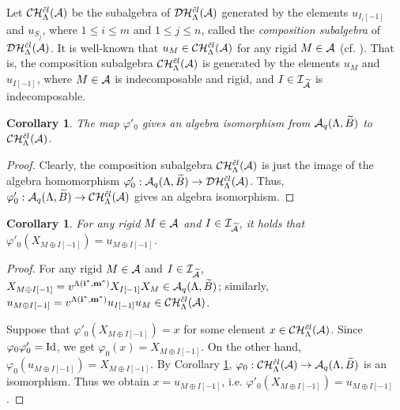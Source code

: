 \documentclass[reqno,12pt]{amsart}
\numberwithin{equation}{section}
\theoremstyle{plain} %
\newtheorem{corollary}[theorem]{\bf Corollary}
\theoremstyle{definition} %
\begin{document}
Let $\mathcal {C}\mathcal {H}_\Lambda^{{\tilde{c}l}}({\mathcal{A}})$ be the subalgebra of $\mathcal {D}\mathcal {H}_\Lambda^{{\tilde{c}l}}({\mathcal{A}})$ generated by the elements $u_{I_i[-1]}$ and $u_{S_j}$, where $1\leq i\leq m$ and $1\leq j\leq n$, called the {\em composition subalgebra} of $\mathcal {D}\mathcal {H}_\Lambda^{{\tilde{c}l}}({\mathcal{A}})$.
It is well-known that $u_M\in\mathcal {C}\mathcal {H}_\Lambda^{{\tilde{c}l}}({\mathcal{A}})$ for any rigid $M\in\mathcal{A}$ (cf. \cite[Theorem 2]{ZhangP}). That is, the composition subalgebra $\mathcal {C}\mathcal {H}_\Lambda^{{\tilde{c}l}}({\mathcal{A}})$ is generated by the elements $u_M$ and $u_{I[-1]}$, where $M\in \mathcal{A}$ is indecomposable and rigid, and $I\in \mathcal{I}_{\widetilde{\mathcal{A}}}$ is indecomposable.
\begin{corollary}\label{congshixian}
The map $\varphi'_0$ gives an algebra isomorphism from $\mathcal{A}_q(\Lambda,\widetilde{B})$ to $\mathcal {C}\mathcal {H}_\Lambda^{{\tilde{c}l}}({\mathcal{A}})$.
\end{corollary}
\begin{proof}
Clearly, the composition subalgebra $\mathcal {C}\mathcal {H}_\Lambda^{{\tilde{c}l}}({\mathcal{A}})$ is just the image of the algebra homomorphism $\varphi'_0:\mathcal{A}_q(\Lambda,\widetilde{B})\rightarrow\mathcal {D}\mathcal {H}_\Lambda^{{\tilde{c}l}}({\mathcal{A}})$. Thus, $\varphi'_0:\mathcal{A}_q(\Lambda,\widetilde{B})\rightarrow \mathcal {C}\mathcal {H}_\Lambda^{{\tilde{c}l}}({\mathcal{A}})$ gives an algebra isomorphism.
\end{proof}
\begin{corollary}\label{congshixianimg}
For any rigid $M\in{\mathcal{A}}$ and $I\in \mathcal{I}_{\widetilde{\mathcal{A}}}$, it holds that $\varphi'_0(X_{M\oplus I[-1]})=u_{M\oplus I[-1]}$.
\end{corollary}
\begin{proof}
For any rigid $M\in{\mathcal{A}}$ and $I\in \mathcal{I}_{\widetilde{\mathcal{A}}}$, $X_{M\oplus I[-1]}=v^{\Lambda({\bf i}^\ast,{\bf m}^\ast)}X_{I[-1]} X_{M}\in \mathcal{A}_q(\Lambda,\widetilde{B})$; similarly, $u_{M\oplus I[-1]}=v^{\Lambda({\bf i}^\ast,{\bf m}^\ast)}u_{I[-1]} u_{M}\in \mathcal {C}\mathcal {H}_\Lambda^{{\tilde{c}l}}({\mathcal{A}})$.

Suppose that $\varphi'_0(X_{M\oplus I[-1]})=x$ for some element $x\in\mathcal {C}\mathcal {H}_\Lambda^{{\tilde{c}l}}({\mathcal{A}})$.
Since $\varphi_0\varphi'_0={\rm Id}$, we get $\varphi_0(x)=X_{M\oplus I[-1]}$.
On the other hand, $\varphi_0(u_{M\oplus I[-1]})=X_{M\oplus I[-1]}$. By Corollary \ref{congshixian}, $\varphi_0:\mathcal {C}\mathcal {H}_\Lambda^{{\tilde{c}l}}({\mathcal{A}})\rightarrow\mathcal{A}_q(\Lambda,\widetilde{B})$ is an isomorphism. Thus we obtain $x=u_{M\oplus I[-1]}$, i.e. $\varphi'_0(X_{M\oplus I[-1]})=u_{M\oplus I[-1]}$.
\end{proof}
\end{document}
